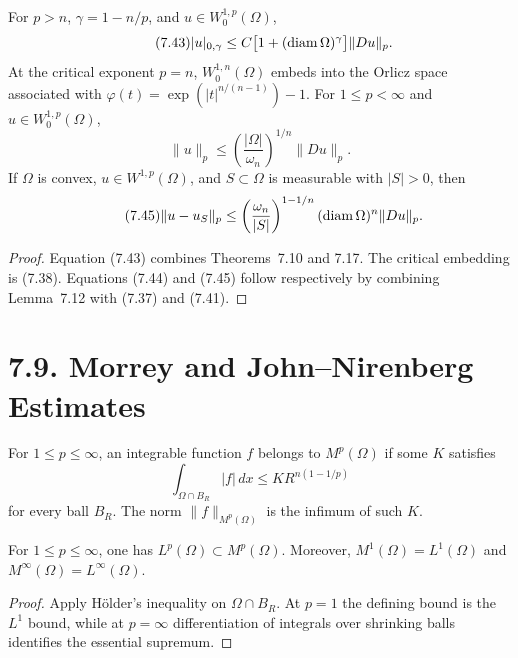 \begin{corollary}
\label{gt:cor-sobolev-global-estimates}
For $p>n$, $\gamma=1-n/p$, and $u\in W_0^{1,p}(\Omega)$,
\begin{equation}
\tag{7.43}
|u|_{0,\gamma}\leq C\bigl[1+(\operatorname{diam}\Omega)^\gamma\bigr]\|Du\|_p.
\end{equation}
At the critical exponent $p=n$, $W_0^{1,n}(\Omega)$ embeds into the Orlicz
space associated with
$\varphi(t)=\exp(|t|^{n/(n-1)})-1$.
For $1\leq p<\infty$ and $u\in W_0^{1,p}(\Omega)$,
\begin{equation}
\tag{7.44}
\|u\|_p\leq\left(\frac{|\Omega|}{\omega_n}\right)^{1/n}\|Du\|_p.
\end{equation}
If $\Omega$ is convex, $u\in W^{1,p}(\Omega)$, and
$S\subset\Omega$ is measurable with $|S|>0$, then
\begin{equation}
\tag{7.45}
\|u-u_S\|_p\leq
\left(\frac{\omega_n}{|S|}\right)^{1-1/n}
(\operatorname{diam}\Omega)^n\|Du\|_p.
\end{equation}
\end{corollary}
\begin{proof}
\sketch Equation (7.43) combines Theorems~7.10 and 7.17. The critical
embedding is (7.38). Equations (7.44) and (7.45) follow respectively by
combining Lemma~7.12 with (7.37) and (7.41).
\end{proof}

\section*{7.9. Morrey and John--Nirenberg Estimates}
\label{gt:sec-morrey-john-nirenberg}

\begin{definition}
\label{gt:def-sobolev-morrey-space}
For $1\leq p\leq\infty$, an integrable function $f$ belongs to
$M^p(\Omega)$ if some $K$ satisfies
\begin{equation}
\tag{7.46}
\int_{\Omega\cap B_R}|f|\,dx\leq KR^{n(1-1/p)}
\end{equation}
for every ball $B_R$. The norm $\|f\|_{M^p(\Omega)}$ is the infimum of such
$K$.
\end{definition}

\begin{proposition}
\label{gt:prop-sobolev-morrey-inclusions}
For $1\leq p\leq\infty$, one has $L^p(\Omega)\subset M^p(\Omega)$.
Moreover, $M^1(\Omega)=L^1(\Omega)$ and
$M^\infty(\Omega)=L^\infty(\Omega)$.
\end{proposition}
\begin{proof}
\sketch Apply H\"older's inequality on $\Omega\cap B_R$. At $p=1$ the
defining bound is the $L^1$ bound, while at $p=\infty$ differentiation of
integrals over shrinking balls identifies the essential supremum.
\end{proof}

